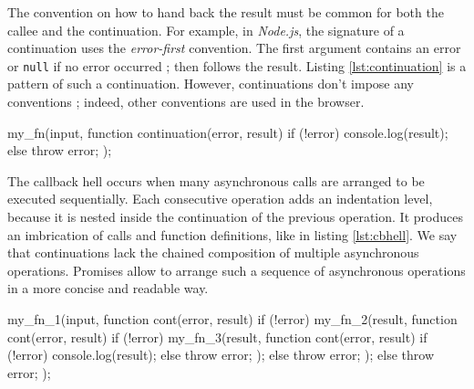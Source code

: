 The convention on how to hand back the result must be common for both the callee and the continuation.
For example, in \textit{Node.js}, the signature of a continuation uses the \textit{error-first} convention.
The first argument contains an error or \texttt{null} if no error occurred ; then follows the result.
Listing \ref{lst:continuation} is a pattern of such a continuation.
However, continuations don't impose any conventions ; indeed, other conventions are used in the browser.

\begin{code}[js, %
             caption={Example of a continuation}, %
             label={lst:continuation}] %
my_fn(input, function continuation(error, result) {
  if (!error) {
    console.log(result);
  } else {
    throw error;
  }
});
\end{code}

The callback hell occurs when many asynchronous calls are arranged to be executed sequentially.
Each consecutive operation adds an indentation level, because it is nested inside the continuation of the previous operation.
It produces an imbrication of calls and function definitions, like in listing \ref{lst:cbhell}.
We say that continuations lack the chained composition of multiple asynchronous operations.
Promises allow to arrange such a sequence of asynchronous operations in a more concise and readable way.


\begin{code}[js, %
             caption={Example of a sequence of continuations}, %
             label={lst:cbhell}] %
my_fn_1(input, function cont(error, result) {
  if (!error) {
    my_fn_2(result, function cont(error, result) {
      if (!error) {
        my_fn_3(result, function cont(error, result) {
          if (!error) {
            console.log(result);
          } else {
            throw error;
          }
        });
      } else {
        throw error;
      }
    });
  } else {
    throw error;
  }
});
\end{code}

